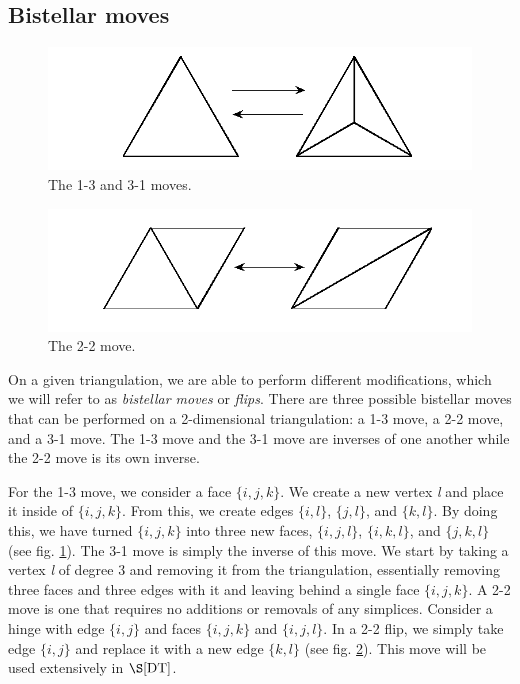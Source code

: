 \documentclass[12pt]{article}
\begin{document}
\subsection{Bistellar moves}

\begin{figure}
\centering
\includegraphics[scale = 0.8]{Pictures3/Flip1331.png}
\caption{The 1-3 and 3-1 moves.}
\label{fig:flip2}
\end{figure}


\begin{figure}
\centering
\includegraphics[scale = 0.8]{Pictures3/Flip2.png}
\caption{The 2-2 move.}
\label{fig:flip}
\end{figure}

 On a given triangulation, we are able to perform different modifications, which we will refer to as \textit{bistellar moves} or \textit{flips}. There are three possible bistellar moves that can be performed on a 2-dimensional triangulation: a 1-3 move, a 2-2 move, and a 3-1 move. The 1-3 move and the 3-1 move are inverses of one another while the 2-2 move is its own inverse.

 For the 1-3 move, we consider a face $\{i, j, k\}$. We create a new vertex \textit{l} and place it inside of $\{i, j, k\}$. From this, we create edges $\{i, l\}$, $\{j, l\}$, and $\{k, l\}$. By doing this, we have turned $\{i, j, k\}$ into three new faces, $\{i, j, l\}$, $\{i, k, l\}$, and $\{j, k, l\}$ (see fig. \ref{fig:flip2}). The 3-1 move is simply the inverse of this move. We start by taking a vertex \textit{l} of degree 3 and removing it from the triangulation, essentially removing three faces and three edges with it and leaving behind a single face $\{i, j, k\}$. A 2-2 move is one that requires no additions or removals of any simplices. Consider a hinge with edge $\{i, j\}$ and faces $\{i, j, k\}$ and $\{i, j, l\}$. In a 2-2 flip, we simply take edge $\{i, j\}$ and replace it with a new edge $\{k, l\}$ (see fig. \ref{fig:flip}). This move will be used extensively in $\S\ref{DT}$.
\end{document}
